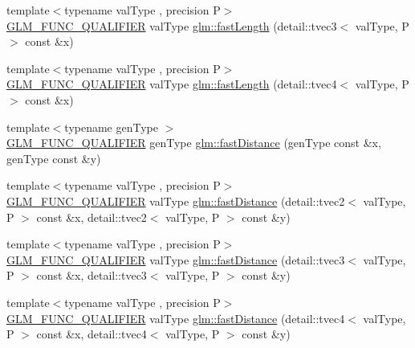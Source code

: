 \begin{DoxyCompactItemize}
\item 
{\footnotesize template$<$typename val\+Type , precision P$>$ }\\\hyperlink{setup_8hpp_a33fdea6f91c5f834105f7415e2a64407}{G\+L\+M\+\_\+\+F\+U\+N\+C\+\_\+\+Q\+U\+A\+L\+I\+F\+I\+ER} val\+Type \hyperlink{namespaceglm_aa0d5ca1b5137d3ac5fd2540e64bbd392}{glm\+::fast\+Length} (detail\+::tvec3$<$ val\+Type, P $>$ const \&x)
\item 
{\footnotesize template$<$typename val\+Type , precision P$>$ }\\\hyperlink{setup_8hpp_a33fdea6f91c5f834105f7415e2a64407}{G\+L\+M\+\_\+\+F\+U\+N\+C\+\_\+\+Q\+U\+A\+L\+I\+F\+I\+ER} val\+Type \hyperlink{namespaceglm_af2f50a91884f2201588d4cef66dd7ff0}{glm\+::fast\+Length} (detail\+::tvec4$<$ val\+Type, P $>$ const \&x)
\item 
{\footnotesize template$<$typename gen\+Type $>$ }\\\hyperlink{setup_8hpp_a33fdea6f91c5f834105f7415e2a64407}{G\+L\+M\+\_\+\+F\+U\+N\+C\+\_\+\+Q\+U\+A\+L\+I\+F\+I\+ER} gen\+Type \hyperlink{group__gtx__fast__square__root_ga69778792fcadc29f586efa3ec2118cdc}{glm\+::fast\+Distance} (gen\+Type const \&x, gen\+Type const \&y)
\item 
{\footnotesize template$<$typename val\+Type , precision P$>$ }\\\hyperlink{setup_8hpp_a33fdea6f91c5f834105f7415e2a64407}{G\+L\+M\+\_\+\+F\+U\+N\+C\+\_\+\+Q\+U\+A\+L\+I\+F\+I\+ER} val\+Type \hyperlink{namespaceglm_abad0f73feba7bba2a34268ea6464ef92}{glm\+::fast\+Distance} (detail\+::tvec2$<$ val\+Type, P $>$ const \&x, detail\+::tvec2$<$ val\+Type, P $>$ const \&y)
\item 
{\footnotesize template$<$typename val\+Type , precision P$>$ }\\\hyperlink{setup_8hpp_a33fdea6f91c5f834105f7415e2a64407}{G\+L\+M\+\_\+\+F\+U\+N\+C\+\_\+\+Q\+U\+A\+L\+I\+F\+I\+ER} val\+Type \hyperlink{namespaceglm_ae821b1d9d6994f4991f8ebeafb762282}{glm\+::fast\+Distance} (detail\+::tvec3$<$ val\+Type, P $>$ const \&x, detail\+::tvec3$<$ val\+Type, P $>$ const \&y)
\item 
{\footnotesize template$<$typename val\+Type , precision P$>$ }\\\hyperlink{setup_8hpp_a33fdea6f91c5f834105f7415e2a64407}{G\+L\+M\+\_\+\+F\+U\+N\+C\+\_\+\+Q\+U\+A\+L\+I\+F\+I\+ER} val\+Type \hyperlink{namespaceglm_a8aa811e84bd1f8d69f4ff2185ec4e4f2}{glm\+::fast\+Distance} (detail\+::tvec4$<$ val\+Type, P $>$ const \&x, detail\+::tvec4$<$ val\+Type, P $>$ const \&y)
\item 

\end{DoxyCompactItemize}
